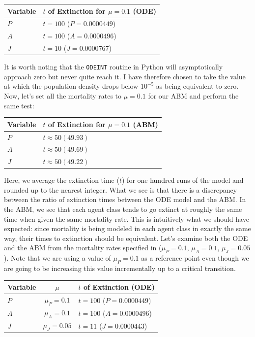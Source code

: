 \documentclass[12pt]{article}
\begin{document}
\begin{center}
	\begin{tabular}{| l | l | }
	\hline
	Variable & $t$ of Extinction for $\mu = 0.1$ (ODE) \\ \hline
	$P$  & $t = 100$ ($P = 0.0000449$)  \\ \hline
	$A$ & $t = 100$ ($A = 0.0000496$) \\ \hline
	$J$  & $t=10$ ($J = 0.0000767$)  \\ \hline
	\end{tabular}
 \end{center}

It is worth noting that the \texttt{ODEINT} routine in Python will asymptotically approach zero but never quite reach it. I have therefore chosen to take the value at which the population density drops below $10^{-5}$ as being equivalent to zero. Now, let's set all the mortality rates to $\mu = 0.1$ for our ABM and perform the same test:

\begin{center}
	\begin{tabular}{| l | l | }
	\hline
	Variable & $t$ of Extinction for $\mu = 0.1$  (ABM) \\ \hline
	$P$  & $t \approx 50 (49.93)$\\ \hline
	$A$ & $t \approx 50 (49.69)$ \\ \hline
	$J$  & $t \approx 50 ( 49.22)$  \\ \hline
	\end{tabular}
 \end{center}

Here, we average the extinction time ($t$) for one hundred runs of the model and rounded up to the nearest integer. What we see is that there is a discrepancy between the ratio of extinction times between the ODE model and the ABM. In the ABM, we see that each agent class tends to go extinct at roughly the same time when given the same mortality rate. This is intuitively what we should have expected: since mortality is being modeled in each agent class in exactly the same way, their times to extinction should be equivalent. Let's examine both the ODE and the ABM from the mortality rates specified in \cite{Boerlijst2013} ($\mu_P = 0.1$, $\mu_A = 0.1$, $\mu_J = 0.05$). Note that we are using a value of $\mu_P = 0.1$ as a reference point even though we are going to be increasing this value incrementally up to a critical transition. 

\begin{center}
	\begin{tabular}{| l | c | l | }
	\hline
	Variable & $\mu$ & $t$ of Extinction (ODE) \\ \hline
	$P$  & $\mu_P = 0.1$ & $t = 100$ ($P = 0.0000449$)  \\ \hline
	$A$ & $ \mu_A = 0.1$ & $t = 100$ ($A = 0.0000496$) \\ \hline
	$J$  & $\mu_J = 0.05 $ & $t=11$ ($J = 0.0000443$)  \\ \hline
	\end{tabular}
 \end{center}
\end{document}
